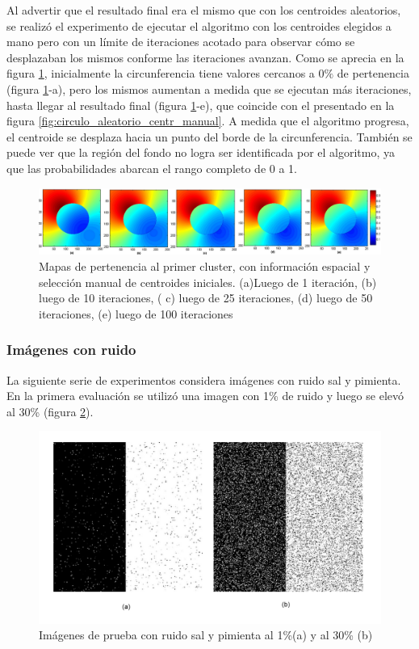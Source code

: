 Al advertir que el resultado final era el mismo que con los centroides aleatorios,  se realizó el experimento de ejecutar el algoritmo con los centroides elegidos a mano pero con un límite de iteraciones acotado para observar cómo se desplazaban los mismos conforme las iteraciones avanzan. Como se aprecia en la figura \ref{fig:circulo_iteraciones}, inicialmente la circunferencia tiene valores cercanos a $0\%$ de pertenencia (figura \ref{fig:circulo_iteraciones}-a), pero los mismos aumentan a medida que se ejecutan más iteraciones, hasta llegar al resultado final (figura \ref{fig:circulo_iteraciones}-e), que coincide con el presentado en la figura \ref{fig:circulo_aleatorio_centr_manual}. A medida que el algoritmo progresa, el centroide se desplaza hacia un punto del borde de la circunferencia. También se puede ver que la región del fondo no logra ser identificada por el algoritmo, ya que las probabilidades abarcan el rango completo de 0 a 1. 

\begin{figure}[H]
\centering
\includegraphics[scale=0.08]{images/circulo_iteraciones_x1.jpg}
\caption{Mapas de pertenencia al primer cluster, con información espacial y selección manual de centroides iniciales. (a)Luego de 1 iteración, (b) luego de 10 iteraciones, ( c) luego de 25 iteraciones, (d) luego de 50 iteraciones, (e) luego de 100 iteraciones}
\label{fig:circulo_iteraciones}
\end{figure}

\subsubsection{Imágenes con ruido}
La siguiente serie de experimentos considera imágenes con ruido sal y pimienta. En la primera evaluación se utilizó una imagen con 1\% de ruido y luego se elevó al 30\% (figura \ref{fig:mitad_mitad_ruido_1p}).

\begin{figure}[H]
\centering
\includegraphics[scale=0.06]{images/original_mitad_con_ruido_1y30.jpg}
\caption{Imágenes de prueba con ruido sal y pimienta al 1\%(a) y al 30\% (b)}
\label{fig:mitad_mitad_ruido_1p}
\end{figure}

